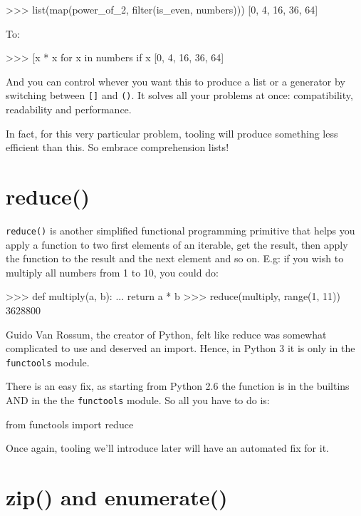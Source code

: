 \begin{py2and3}
>>> list(map(power_of_2, filter(is_even, numbers)))
[0, 4, 16, 36, 64]
\end{py2and3}

To:

\begin{py2and3}
>>> [x * x for x in numbers if x %
[0, 4, 16, 36, 64]
\end{py2and3}

And you can control whever you want this to produce a list or a generator by switching between \lstinline{[]} and \lstinline{()}. It solves all your problems at once: compatibility, readability and performance.

In fact, for this very particular problem, tooling will produce something less efficient than this. So embrace comprehension lists!

\section{reduce()}

\lstinline{reduce()} is another simplified functional programming primitive that helps you apply a function to two first elements of an iterable, get the result, then apply the function to the result and the next element and so on. E.g: if you wish to multiply all numbers from 1 to 10, you could do:

\begin{py2}
>>> def multiply(a, b):
...     return a * b
>>> reduce(multiply, range(1, 11))
3628800
\end{py2}

Guido Van Rossum, the creator of Python, felt like reduce was somewhat complicated to use and deserved an import. Hence, in Python 3 it is only in the \lstinline{functools} module.

There is an easy fix, as starting from Python 2.6 the function is in the builtins AND in the the \lstinline{functools} module. So all you have to do is:

\begin{py2and3}
from functools import reduce
\end{py2and3}

Once again, tooling we'll introduce later will have an automated fix for it.

\section{zip() and enumerate()}

